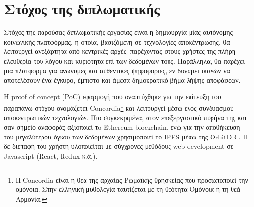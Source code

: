 \section{Στόχος της διπλωματικής} \label{section:1-4-thesis-goal}

Στόχος της παρούσας διπλωματικής εργασίας είναι η δημιουργία μίας αυτόνομης κοινωνικής πλατφόρμας, η οποία, βασιζόμενη σε τεχνολογίες αποκέντρωσης, θα λειτουργεί ανεξάρτητα από κεντρικές αρχές, παρέχοντας στους χρήστες της πλήρη ελευθερία του λόγου και κυριότητα επί των δεδομένων τους. Παράλληλα, θα παρέχει μία πλατφόρμα για ανώνυμες και αυθεντικές ψηφοφορίες, εν δυνάμει ικανών να αποτελέσουν ένα έγκυρο, έμπιστο και άμεσα δημοκρατικό βήμα λήψης αποφάσεων.

Η proof of concept (PoC) εφαρμογή που αναπτύχθηκε για την επίτευξη του παραπάνω στόχου ονομάζεται Concordia\footnote{Η Concordia είναι η θεά της αρχαίας Ρωμαϊκής θρησκείας που προσωποποιεί την ομόνοια. Στην ελληνική μυθολογία ταυτίζεται με τη θεότητα Ομόνοια ή τη θεά Αρμονία.} και λειτουργεί μέσω ενός συνδυασμού αποκεντρωτικών τεχνολογιών. Πιο συγκεκριμένα, στον επεξεργαστικό πυρήνα της και σαν σημείο αναφοράς αξιοποιεί τo Ethereum blockchain, ενώ για την αποθήκευση του μεγαλύτερου όγκου των δεδομένων χρησιμοποιεί το IPFS μέσω της OrbitDB . Η δε διεπαφή του χρήστη υλοποιείται με σύγχρονες μεθόδους web development σε Javascript (React, Redux κ.ά.).
